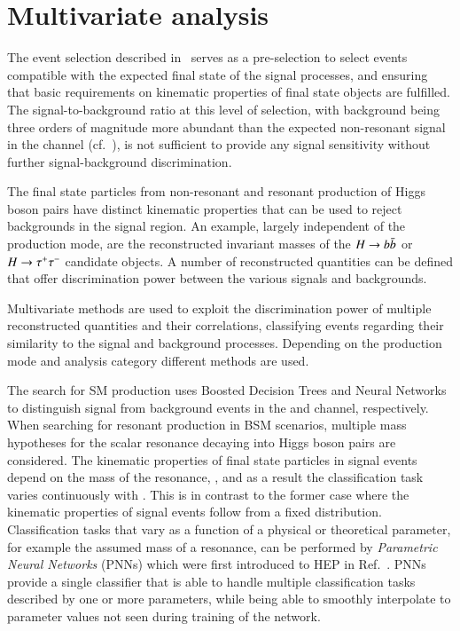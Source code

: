 \section{Multivariate analysis}%
\label{sec:multivariate_analysis}

The event selection described in~ serves as
a pre-selection to select events compatible with the expected final
state of the signal processes, and ensuring that basic requirements on
kinematic properties of final state objects are fulfilled. %
The signal-to-background ratio at this level of selection, with
background being three orders of magnitude more abundant than the
expected non-resonant \HH signal in the \hadhad channel
(cf.~), is not sufficient to provide
any signal sensitivity without further signal-background
discrimination.

The final state particles from non-resonant and resonant production of
Higgs boson pairs have distinct kinematic properties that can be used
to reject backgrounds in the signal region. An example, largely
independent of the \HH production mode, are the reconstructed
invariant masses of the $H \to b\bar{b}$ or $H \to \tau^{+} \tau^{-}$ candidate
objects. A number of reconstructed quantities can be defined that
offer discrimination power between the various signals and
backgrounds.

Multivariate methods are used to exploit the discrimination power of
multiple reconstructed quantities and their correlations, classifying
events regarding their similarity to the signal and background
processes. Depending on the \HH production mode and analysis category
different methods are used.

The search for SM \HH production uses Boosted Decision Trees and
Neural Networks to distinguish signal from background events in the
\hadhad and \lephad channel, respectively. When searching for resonant
\HH production in BSM scenarios, multiple mass hypotheses for the
scalar resonance decaying into Higgs boson pairs are considered. The
kinematic properties of final state particles in signal events depend
on the mass of the resonance, \mX, and as a result the classification
task varies continuously with \mX. This is in contrast to the former
case where the kinematic properties of signal events follow from a
fixed distribution. Classification tasks that vary as a function of a
physical or theoretical parameter, for example the assumed mass of a
resonance, can be performed by \emph{Parametric Neural Networks}
(PNNs) which were first introduced to HEP in
Ref.~\cite{Baldi:2016fzo}. PNNs provide a single classifier that is
able to handle multiple classification tasks described by one or more
parameters, while being able to smoothly interpolate to parameter
values not seen during training of the network.

